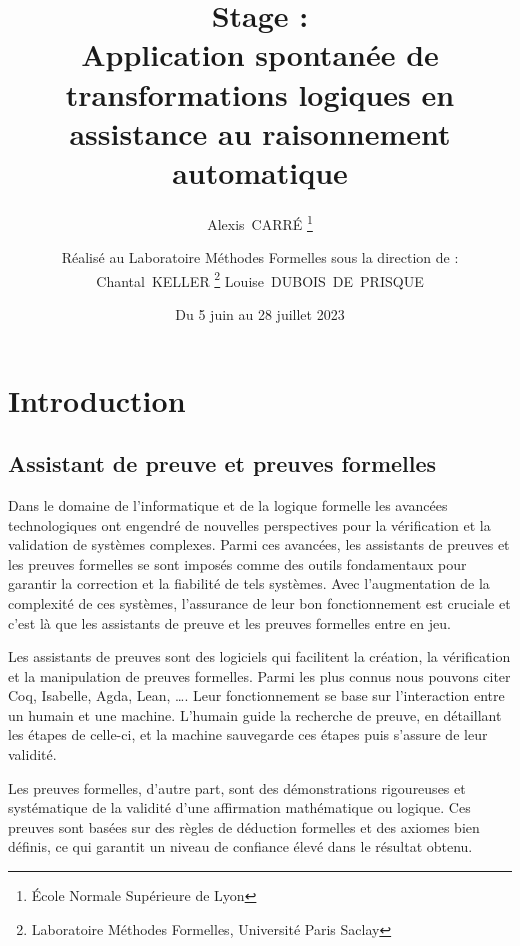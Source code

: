 \documentclass[french,titlepage]{article}
\begin{document}
\title{
    Stage :\\[1em]
    Application spontanée de transformations logiques en assistance au raisonnement automatique
}
\date{Du 5 juin au 28 juillet 2023}
\author{
    Alexis~CARRÉ \thanks{École Normale Supérieure de Lyon}
    \vspace{1em}
    \and
    Réalisé au Laboratoire Méthodes Formelles sous la direction de :\\[1em]
    Chantal~KELLER \thanks{Laboratoire Méthodes Formelles, Université Paris Saclay}
    \hspace{1em}
    Louise~DUBOIS~DE~PRISQUE\footnotemark[2]
    \vspace{2em}
}
\maketitle



\tableofcontents
\newpage



\section{Introduction} \label{intro}
\subsection{Assistant de preuve et preuves formelles} \label{intro:preuves_formelles}
Dans le domaine de l'informatique et de la logique formelle les avancées technologiques ont engendré de nouvelles perspectives pour la vérification et la validation de systèmes complexes. Parmi ces avancées, les assistants de preuves et les preuves formelles se sont imposés comme des outils fondamentaux pour garantir la correction et la fiabilité de tels systèmes. Avec l'augmentation de la complexité de ces systèmes, l'assurance de leur bon fonctionnement est cruciale et c'est là que les assistants de preuve et les preuves formelles entre en jeu.

Les assistants de preuves sont des logiciels qui facilitent la création, la vérification et la manipulation de preuves formelles. Parmi les plus connus nous pouvons citer Coq, Isabelle, Agda, Lean, \dots. Leur fonctionnement se base sur l'interaction entre un humain et une machine. L'humain guide la recherche de preuve, en détaillant les étapes de celle-ci, et la machine sauvegarde ces étapes puis s'assure de leur validité.

Les preuves formelles, d'autre part, sont des démonstrations rigoureuses et systématique de la validité d'une affirmation mathématique ou logique. Ces preuves sont basées sur des règles de déduction formelles et des axiomes bien définis, ce qui garantit un niveau de confiance élevé dans le résultat obtenu.
\end{document}

